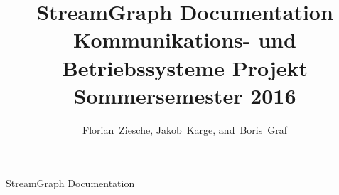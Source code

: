 \documentclass[journal]{IEEEtran}
\begin{document}
%
\title{StreamGraph Documentation\\ Kommunikations- und Betriebssysteme Projekt Sommersemester 2016}
%
%
%

\author{Florian~Ziesche, Jakob~Karge, and~Boris~Graf}

% 
%



%
{StreamGraph Documentation}
% 
\end{document}

